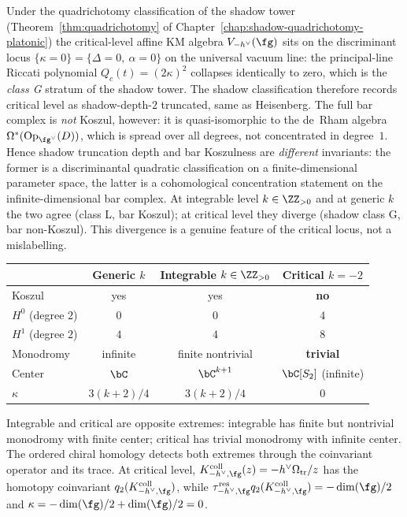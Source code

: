 \begin{remark}
\label{rem:critical-shadow-vs-bar-koszul}
Under the quadrichotomy classification of the shadow tower
(Theorem~\ref{thm:quadrichotomy} of
Chapter~\ref{chap:shadow-quadrichotomy-platonic}) the critical-level
affine KM algebra $V_{-h^\vee}(\fg)$ sits on the discriminant
locus $\{\kappa = 0\} = \{\Delta = 0,\ \alpha = 0\}$ on the
universal vacuum line: the principal-line Riccati polynomial
$Q_c(t) = (2\kappa)^{2}$ collapses identically to zero, which is
the \emph{class G} stratum of the shadow tower. The shadow classification
therefore records critical level as shadow-depth-$2$ truncated, same
as Heisenberg. The full bar complex is \emph{not} Koszul, however:
it is quasi-isomorphic to the de~Rham algebra
$\Omega^{*}(\operatorname{Op}_{\fg^\vee}(D))$, which is spread over
all degrees, not concentrated in degree~$1$. Hence shadow truncation
depth and bar Koszulness are \emph{different} invariants: the former
is a discriminantal quadratic classification on a finite-dimensional
parameter space, the latter is a cohomological concentration
statement on the infinite-dimensional bar complex. At integrable
level $k \in \ZZ_{>0}$ and at generic $k$ the two agree (class L,
bar Koszul); at critical level they diverge (shadow class G, bar
non-Koszul). This divergence is a genuine feature of the critical
locus, not a mislabelling.
\end{remark}

\begin{remark}
\label{rem:three-level-contrast}
\begin{center}
\renewcommand{\arraystretch}{1.3}
\begin{tabular}{@{} l c c c @{}}
\toprule
& Generic $k$ & Integrable $k \in \ZZ_{>0}$
& Critical $k = -2$ \\
\midrule
Koszul & yes & yes & \textbf{no} \\
$H^0$ (degree $2$) & $0$ & $0$ & $4$ \\
$H^1$ (degree $2$) & $4$ & $4$ & $8$ \\
Monodromy & infinite & finite nontrivial
 & \textbf{trivial} \\
Center & $\bC$ & $\bC^{k+1}$ & $\bC[S_2]$ (infinite) \\
$\kappa$ & $3(k{+}2)/4$ & $3(k{+}2)/4$ & $0$ \\
\bottomrule
\end{tabular}
\end{center}
Integrable and critical are opposite extremes: integrable
has finite but nontrivial monodromy with finite center;
critical has trivial monodromy with infinite center.
The ordered chiral homology detects both extremes through the
coinvariant operator and its trace. At critical level,
$K_{-h^\vee,\fg}^{\mathrm{coll}}(z)
=-h^\vee\Omega_{\mathrm{tr}}/z$ has the homotopy coinvariant
$q_2(K_{-h^\vee,\fg}^{\mathrm{coll}})$, while
$\tau_{-h^\vee,\fg}^{\mathrm{res}}q_2
(K_{-h^\vee,\fg}^{\mathrm{coll}})=-\dim(\fg)/2$ and
$\kappa=-\dim(\fg)/2+\dim(\fg)/2=0$.
\end{remark}

